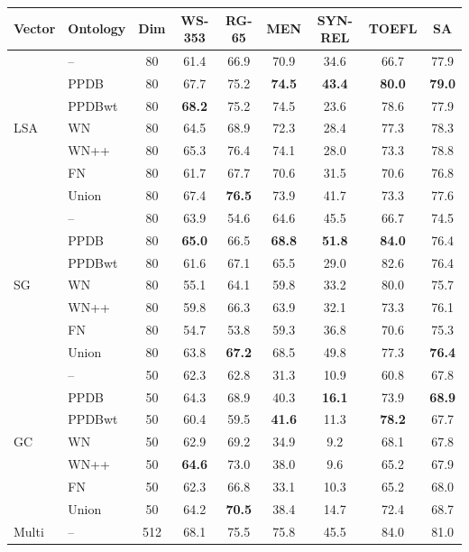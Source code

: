 \documentclass[11pt]{article}
\begin{document}
\begin{table}[!tbh]
  \centering
  \small
  \begin{tabular}{l|l|c||c|c|c||c|c||c}
Vector & Ontology & Dim & WS-353 & RG-65 & MEN & SYN-REL & TOEFL & SA \\
\hline
\multirow{7}{*}{LSA} & -- & 80 & 61.4 & 66.9 & 70.9 & 34.6 & 66.7 & 77.9\\

& PPDB & 80 & 67.7 & 75.2 & \textbf{74.5} & \textbf{43.4} & \textbf{80.0} & \textbf{79.0}\\
& PPDBwt & 80 & \textbf{68.2} & 75.2 & 74.5 & 23.6 & 78.6 & 77.9\\
& WN & 80 & 64.5 & 68.9 & 72.3 & 28.4 & 77.3 & 78.3\\
& WN++ & 80 & 65.3 & 76.4 & 74.1 & 28.0 & 73.3 & 78.8\\
& FN & 80 & 61.7 & 67.7 & 70.6 & 31.5 & 70.6 & 76.8\\
& Union & 80 & 67.4 & \textbf{76.5} & 73.9 & 41.7 & 73.3 & 77.6\\
\hline\hline
\multirow{7}{*}{SG} & -- & 80 & 63.9 & 54.6 & 64.6 & 45.5 & 66.7 & 74.5 \\

& PPDB & 80 & \textbf{65.0} & 66.5 & \textbf{68.8} & \textbf{51.8} & \textbf{84.0} & 76.4\\
& PPDBwt & 80 & 61.6 & 67.1 & 65.5 & 29.0 & 82.6 &76.4\\
& WN & 80 & 55.1 & 64.1 & 59.8 & 33.2 & 80.0 & 75.7 \\
& WN++ & 80 & 59.8 & 66.3 & 63.9 & 32.1 & 73.3 & 76.1 \\
& FN & 80 & 54.7 & 53.8 & 59.3 & 36.8 & 70.6 & 75.3\\
& Union & 80 & 63.8 & \textbf{67.2} & 68.5 & 49.8 & 77.3 & \textbf{76.4} \\
\hline\hline
\multirow{7}{*}{GC} & -- & 50 & 62.3 & 62.8 & 31.3 & 10.9 & 60.8 & 67.8 \\

& PPDB & 50 & 64.3 & 68.9 & 40.3& \textbf{16.1} & 73.9 & \textbf{68.9}\\
& PPDBwt & 50 & 60.4 & 59.5 & \textbf{41.6} & 11.3 & \textbf{78.2} & 67.7\\
& WN & 50 & 62.9 & 69.2 & 34.9 & 9.2 & 68.1 & 67.8 \\
& WN++ & 50 & \textbf{64.6} & 73.0 & 38.0 & 9.6 & 65.2 & 67.9 \\
& FN & 50 & 62.3 & 66.8 & 33.1 & 10.3 & 65.2 & 68.0\\
& Union & 50 & 64.2 & \textbf{70.5} & 38.4 & 14.7 & 72.4 & 68.7 \\
\hline\hline
\multirow{7}{*}{Multi} & -- & 512 & 68.1 & 75.5 & 75.8 & 45.5 & 84.0 & 81.0 \\


\end{tabular}
\end{table}
\end{document}
